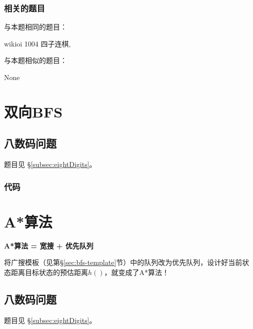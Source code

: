 \subsubsection{相关的题目}
与本题相同的题目：
\begindot
\item  wikioi 1004 四子连棋, 
\myenddot

与本题相似的题目：
\begindot
\item  None
\myenddot


\section{双向BFS} %
\label{sec:biBFS}


\subsection{八数码问题}
题目见 \S \ref{subsec:eightDigits}。

\subsubsection{代码}

\begin{Codex}[label=eight_digits_bibfs.c]

\end{Codex}


\section{A*算法} %
\label{sec:astar}

\textbf{A*算法 = 宽搜 + 优先队列}

将广搜模板（见第\S \ref{sec:bfs-template}节）中的队列改为优先队列，设计好当前状态距离目标状态的预估距离$h()$，就变成了A*算法！

\subsection{八数码问题}
题目见 \S \ref{subsec:eightDigits}。

